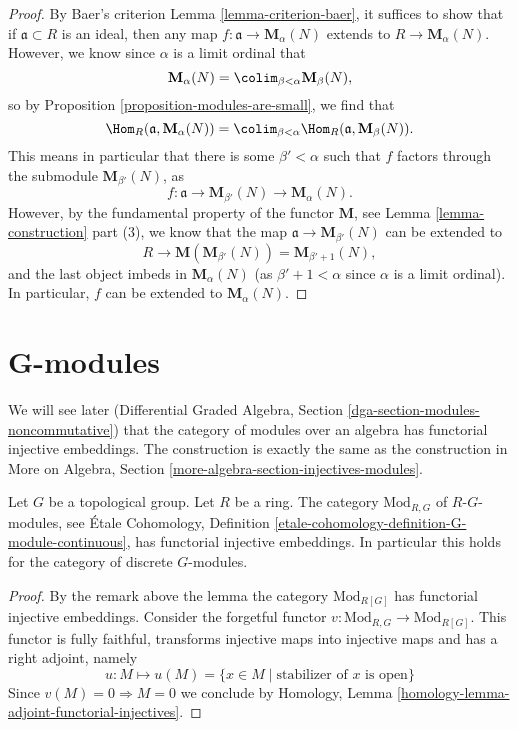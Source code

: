 \begin{proof}
By Baer's criterion
Lemma \ref{lemma-criterion-baer},
it suffices to show that if $\mathfrak{a} \subset R$ is an ideal, then
any map $f : \mathfrak{a} \to \mathbf{M}_\alpha(N)$ extends to
$R \to \mathbf{M}_\alpha(N)$. However, we know since $\alpha$ is a limit
ordinal that
$$
\mathbf{M}_{\alpha}(N) =
\colim_{\beta < \alpha} \mathbf{M}_{\beta}(N),
$$
so by
Proposition \ref{proposition-modules-are-small},
we find that
$$
\Hom_R(\mathfrak{a}, \mathbf{M}_{\alpha}(N)) =
\colim_{\beta < \alpha} \Hom_R(\mathfrak a, \mathbf{M}_{\beta}(N)).
$$
This means in particular that there is some $\beta' < \alpha$
such that $f$ factors through the submodule $\mathbf{M}_{\beta'}(N)$, as
$$
f : \mathfrak{a} \to \mathbf{M}_{\beta'}(N) \to
\mathbf{M}_{\alpha}(N).
$$
However, by the fundamental property of the functor $\mathbf{M}$,
see Lemma \ref{lemma-construction} part (3),
we know that the map $\mathfrak{a} \to \mathbf{M}_{\beta'}(N)$
can be extended to
$$
R \to \mathbf{M}( \mathbf{M}_{\beta'}(N)) =
\mathbf{M}_{\beta' + 1}(N),
$$
and the last object imbeds in $\mathbf{M}_{\alpha}(N)$ (as
$\beta' + 1 < \alpha$ since $\alpha$ is a limit ordinal).
In particular, $f$ can be extended to $\mathbf{M}_{\alpha}(N)$.
\end{proof}




\section{G-modules}
\label{section-G-modules}

\noindent
We will see later
(Differential Graded Algebra, Section \ref{dga-section-modules-noncommutative})
that the category of modules over an algebra has
functorial injective embeddings. The construction is exactly the same
as the construction in
More on Algebra, Section \ref{more-algebra-section-injectives-modules}.

\begin{lemma}
\label{lemma-G-modules}
Let $G$ be a topological group. Let $R$ be a ring.
The category $\text{Mod}_{R, G}$ of $R\text{-}G$-modules, see
\'Etale Cohomology, Definition
\ref{etale-cohomology-definition-G-module-continuous},
has functorial injective embeddings. In particular this holds
for the category of discrete $G$-modules.
\end{lemma}

\begin{proof}
By the remark above the lemma the category $\text{Mod}_{R[G]}$
has functorial injective embeddings.
Consider the forgetful functor
$v : \text{Mod}_{R, G} \to \text{Mod}_{R[G]}$.
This functor is fully faithful, transforms injective maps into
injective maps and has a right adjoint, namely
$$
u : M \mapsto u(M) = \{x \in M \mid \text{stabilizer of }x\text{ is open}\}
$$
Since $v(M) = 0 \Rightarrow M = 0$ we conclude by
Homology, Lemma \ref{homology-lemma-adjoint-functorial-injectives}.
\end{proof}



